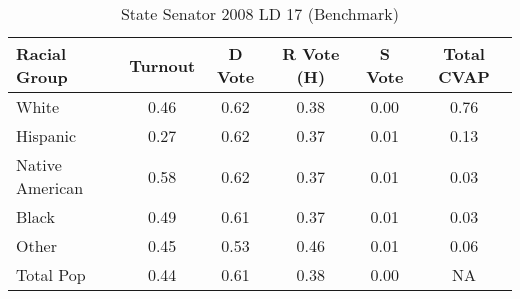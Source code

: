 \begin{table}[htb]
\begin{center}
\caption{State Senator 2008 LD 17 (Benchmark)}
\label{stsen08_cvap_ld_17}
\begin{tabular}{lccccc}
  \hline
Racial Group & Turnout & D Vote & R Vote (H) & S Vote & Total CVAP \\ 
  \hline
	White & 0.46  & 0.62  & 0.38  & 0.00  & 0.76 \\
    Hispanic & 0.27  & 0.62  & 0.37  & 0.01  & 0.13 \\
    Native American & 0.58  & 0.62  & 0.37  & 0.01  & 0.03 \\
    Black & 0.49  & 0.61  & 0.37  & 0.01  & 0.03 \\
    Other & 0.45  & 0.53  & 0.46  & 0.01  & 0.06 \\
    Total Pop & 0.44  & 0.61  & 0.38  & 0.00  & NA \\
   \hline
\end{tabular}
\end{center}
\end{table}